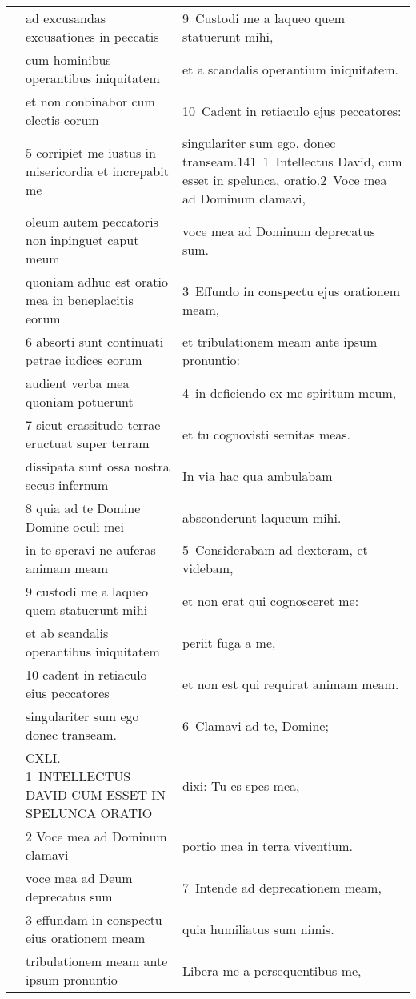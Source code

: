 \documentclass{article}
\begin{document}
\begin{longtable}{@{}p{}p{}p{}@{}}
	&	ad excusandas excusationes in peccatis	&	9 Custodi me a laqueo quem statuerunt mihi,	\\
	&	cum hominibus operantibus iniquitatem	&	et a scandalis operantium iniquitatem.	\\
	&	et non conbinabor cum electis eorum	&	10 Cadent in retiaculo ejus peccatores:	\\
	&	5 corripiet me iustus in misericordia et increpabit me	&	singulariter sum ego, donec transeam.141 1 Intellectus David, cum esset in spelunca, oratio.2 Voce mea ad Dominum clamavi,	\\
	&	oleum autem peccatoris non inpinguet caput meum	&	voce mea ad Dominum deprecatus sum.	\\
	&	quoniam adhuc est oratio mea in beneplacitis eorum	&	3 Effundo in conspectu ejus orationem meam,	\\
	&	6 absorti sunt continuati petrae iudices eorum	&	et tribulationem meam ante ipsum pronuntio:	\\
	&	audient verba mea quoniam potuerunt	&	4 in deficiendo ex me spiritum meum,	\\
	&	7 sicut crassitudo terrae eructuat super terram	&	et tu cognovisti semitas meas.	\\
	&	dissipata sunt ossa nostra secus infernum	&	In via hac qua ambulabam	\\
	&	8 quia ad te Domine Domine oculi mei	&	absconderunt laqueum mihi.	\\
	&	in te speravi ne auferas animam meam	&	5 Considerabam ad dexteram, et videbam,	\\
	&	9 custodi me a laqueo quem statuerunt mihi	&	et non erat qui cognosceret me:	\\
	&	et ab scandalis operantibus iniquitatem	&	periit fuga a me,	\\
	&	10 cadent in retiaculo eius peccatores	&	et non est qui requirat animam meam.	\\
	&	singulariter sum ego donec transeam.	&	6 Clamavi ad te, Domine;	\\
	&	CXLI. 1 INTELLECTUS DAVID CUM ESSET IN SPELUNCA ORATIO	&	dixi: Tu es spes mea,	\\
	&	2 Voce mea ad Dominum clamavi	&	portio mea in terra viventium.	\\
	&	voce mea ad Deum deprecatus sum	&	7 Intende ad deprecationem meam,	\\
	&	3 effundam in conspectu eius orationem meam	&	quia humiliatus sum nimis.	\\
	&	tribulationem meam ante ipsum pronuntio	&	Libera me a persequentibus me,	\\

\end{longtable}
\end{document}
